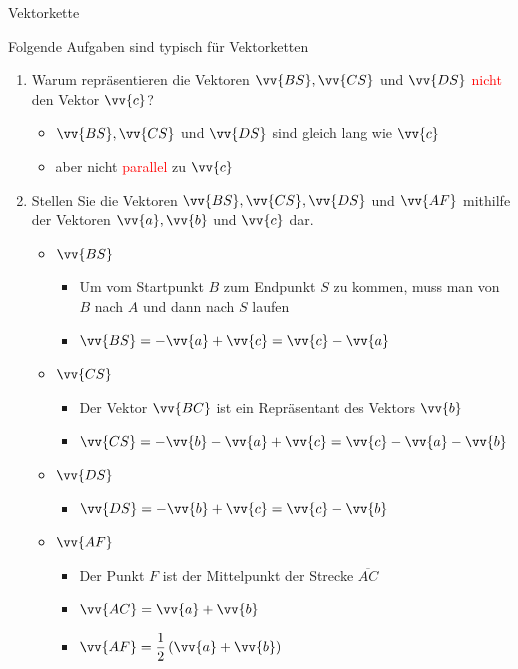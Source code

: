\begin{bsp}{Vektorkette}{}
\begin{center}
\begin{tikzpicture}[font=\boldmath]
\end{tikzpicture}
\end{center}
Folgende Aufgaben sind typisch für Vektorketten
\begin{enumerate}
    \item Warum repräsentieren die Vektoren $\vv{BS}, \vv{CS}$ und $\vv{DS}$ \textcolor{red}{nicht} den Vektor $\vv{c}$?
    \begin{itemize}
        \item $\vv{BS}, \vv{CS}$ und $\vv{DS}$ sind gleich lang wie $\vv{c}$
        \item aber nicht \textcolor{red}{parallel} zu $\vv{c}$
    \end{itemize}
    \item Stellen Sie die Vektoren $\vv{BS}, \vv{CS}, \vv{DS}$ und $\vv{AF}$ mithilfe der Vektoren $\vv{a}, \vv{b}$ und $\vv{c}$ dar.
    \begin{itemize}
        \item $\vv{BS}$
        \begin{itemize}
            \item[$\circ$] Um vom Startpunkt $B$ zum Endpunkt $S$ zu kommen, muss man von $B$ nach $A$ und dann nach $S$ \glqq laufen\grqq{}
            \item[$\circ$] $\vv{BS} = -\vv{a} + \vv{c} = \vv{c} - \vv{a}$
        \end{itemize}       
        \item $\vv{CS}$ 
        \begin{itemize}
            \item[$\circ$] Der Vektor $\vv{BC}$ ist ein Repräsentant des Vektors $\vv{b}$ 
            \item[$\circ$] $\vv{CS} = -\vv{b} - \vv{a} + \vv{c} = \vv{c} - \vv{a} -\vv{b}$
        \end{itemize}
        \item $\vv{DS}$ 
        \begin{itemize}
            \item[$\circ$] $\vv{DS} = -\vv{b} + \vv{c} = \vv{c} - \vv{b}$
        \end{itemize}
         \item $\vv{AF}$ 
         \begin{itemize}
             \item[$\circ$] Der Punkt $F$ ist der Mittelpunkt der Strecke $\overline{AC}$
             \item[$\circ$] $\vv{AC} = \vv{a} + \vv{b}$
             \item[$\circ$] $\vv{AF} = \dfrac{1}{2} \left(\vv{a} + \vv{b} \right)$

\end{itemize}
\end{itemize}
\end{enumerate}
\end{bsp}
